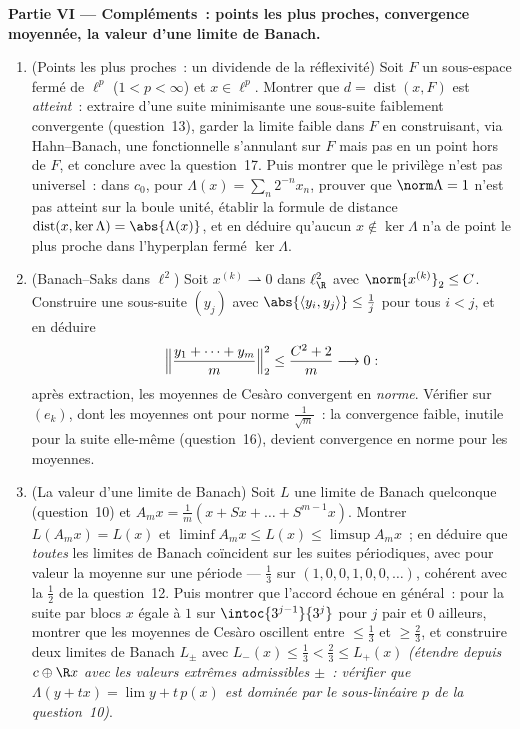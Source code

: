 \begin{problem}[{Problème de fin de semaine --- $(\ell^p)' =
\ell^q$, réflexivité, et l'étrangeté de $\ell^\infty$}]
\medskip
\noindent\textbf{Partie VI --- Compléments~: points les plus
proches, convergence moyennée, la valeur d'une limite de
Banach.}
\begin{enumerate}[resume]
  \item (Points les plus proches~: un dividende de la
        réflexivité) Soit $F$ un sous-espace fermé de
        $\ell^p$ ($1 < p < \infty$) et $x \in \ell^p$.
        Montrer que $d = \operatorname{dist}(x, F)$ est
        \emph{atteint}~: extraire d'une suite minimisante une
        sous-suite faiblement convergente (question~13),
        garder la limite faible dans $F$ en construisant, via
        Hahn--Banach, une fonctionnelle s'annulant sur $F$
        mais pas en un point hors de $F$, et conclure avec la
        question~17. Puis montrer que le privilège n'est pas
        universel~: dans $c_0$, pour $\Lambda(x) =
        \sum_n2^{-n}x_n$, prouver que $\norm\Lambda = 1$ n'est
        pas atteint sur la boule unité, établir la formule de
        distance $\operatorname{dist}(x, \ker\Lambda) =
        \abs{\Lambda(x)}$, et en déduire qu'aucun $x \notin
        \ker\Lambda$ n'a de point le plus proche dans
        l'hyperplan fermé $\ker\Lambda$.
  \item (Banach--Saks dans $\ell^2$) Soit $x^{(k)}
        \rightharpoonup 0$ dans $\ell^2_{\R}$ avec
        $\norm{x^{(k)}}_2 \leq C$. Construire une sous-suite
        $(y_j)$ avec $\abs{\langle y_i, y_j\rangle} \leq
        \frac1j$ pour tous $i < j$, et en déduire
        \[
        \Bigl\lVert\frac{y_1 + \dots + y_m}m\Bigr\rVert_2^2
        \leq \frac{C^2 + 2}m \longrightarrow 0 :
        \]
        après extraction, les moyennes de Cesàro convergent en
        \emph{norme}. Vérifier sur $(e_k)$, dont les moyennes
        ont pour norme $\frac1{\sqrt m}$~: la convergence
        faible, inutile pour la suite elle-même
        (question~16), devient convergence en norme pour les
        moyennes.
  \item (La valeur d'une limite de Banach) Soit $L$ une limite
        de Banach quelconque (question~10) et $A_mx =
        \frac1m(x + Sx + \dots + S^{m-1}x)$. Montrer $L(A_mx)
        = L(x)$ et $\liminf A_mx \leq L(x) \leq \limsup
        A_mx$~; en déduire que \emph{toutes} les limites de
        Banach coïncident sur les suites périodiques, avec
        pour valeur la moyenne sur une période --- $\frac13$
        sur $(1, 0, 0, 1, 0, 0, \dots)$, cohérent avec la
        $\frac12$ de la question~12. Puis montrer que
        l'accord échoue en général~: pour la suite par blocs
        $x$ égale à $1$ sur $\intoc{3^{j-1}}{3^j}$ pour $j$
        pair et $0$ ailleurs, montrer que les moyennes de
        Cesàro oscillent entre $\leq \frac13$ et $\geq
        \frac23$, et construire deux limites de Banach
        $L_\pm$ avec $L_-(x) \leq \frac13 < \frac23 \leq
        L_+(x)$ \emph{(étendre depuis $c \oplus \R x$ avec
        les valeurs extrêmes admissibles $\pm$~: vérifier que
        $\Lambda(y + tx) = \lim y + t\,p(x)$ est dominée par
        le sous-linéaire $p$ de la question~10)}.
\end{enumerate}
\end{problem}
